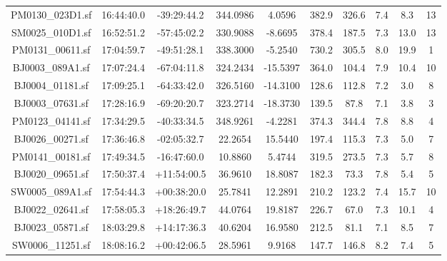 \documentclass[fleqn,usenatbib]{mnras}
\begin{document}
\begin{table}
\begin{scriptsize}
\begin{center}
\begin{tabular}{@{\extracolsep{\fill}}c|c|c|c|c|c|c|c|c|c}
  PM0130\_023D1.sf    &   16:44:40.0  &   -39:29:44.2   &    344.0986    &    4.0596    &    382.9    &    326.6    &    7.4    &    8.3    &    13    \\ 
  SM0025\_010D1.sf    &   16:52:51.2  &   -57:45:02.2   &    330.9088    &    -8.6695    &    378.4    &    187.5    &    7.3    &    13.0    &    13    \\ 
  PM0131\_00611.sf    &   17:04:59.7  &   -49:51:28.1   &    338.3000    &    -5.2540    &    730.2    &    305.5    &    8.0    &    19.9    &    1    \\ 
  BJ0003\_089A1.sf    &   17:07:24.4  &   -67:04:11.8   &    324.2434    &    -15.5397    &    364.0    &    104.4    &    7.9    &    10.4    &    10    \\
    BJ0004\_01181.sf    &   17:09:25.1  &   -64:33:42.0   &    326.5160    &    -14.3100    &    128.6    &    112.8    &    7.2    &    3.0    &    8    \\ 
  BJ0003\_07631.sf    &   17:28:16.9  &   -69:20:20.7   &    323.2714    &    -18.3730    &    139.5    &    87.8    &    7.1    &    3.8    &    3    \\
  PM0123\_04141.sf    &   17:34:29.5  &   -40:33:34.5   &    348.9261    &    -4.2281    &    374.3    &    344.4    &    7.8    &    8.8    &    4    \\ 
  BJ0026\_00271.sf    &   17:36:46.8  &   -02:05:32.7   &    22.2654    &    15.5440    &    197.4    &    115.3    &    7.3    &    5.0    &    7    \\
  PM0141\_00181.sf    &   17:49:34.5  &   -16:47:60.0   &    10.8860    &    5.4744    &    319.5    &    273.5    &    7.3    &    5.7    &    8    \\ 
  BJ0020\_09651.sf    &   17:50:37.4  &   +11:54:00.5   &    36.9610    &    18.8087    &    182.3    &    73.3    &    7.8    &    5.4    &    5    \\ 
  SW0005\_089A1.sf    &   17:54:44.3  &   +00:38:20.0   &    25.7841    &    12.2891    &    210.2    &    123.2    &    7.4    &    15.7    &    10    \\ 
  BJ0022\_02641.sf    &   17:58:05.3  &   +18:26:49.7   &    44.0764    &    19.8187    &    226.7    &    67.0    &    7.3    &    10.1    &    4    \\ 
  BJ0023\_05871.sf    &   18:03:29.8  &   +14:17:36.3   &    40.6204    &    16.9580    &    212.5    &    81.1    &    7.1    &    8.5    &    7    \\ 
  SW0006\_11251.sf    &   18:08:16.2  &   +00:42:06.5   &    28.5961    &    9.9168    &    147.7    &    146.8    &    8.2    &    7.4    &    5    \\ 

\end{tabular}
\end{center}
\end{scriptsize}
\end{table}
\end{document}
